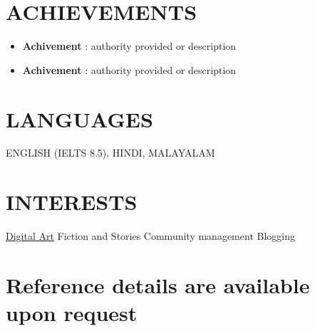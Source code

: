\documentclass[letterpaper,11pt]{article}
\begin{document}
\section{ACHIEVEMENTS}
 \begin{itemize}[leftmargin=0in, label={}]


 \item{ \textbf{Achivement } 
 : authority provided or description} 

  \item{ \textbf{Achivement } 
 : authority provided or description} 

    
 \end{itemize}
 
\section{LANGUAGES}
ENGLISH (IELTS 8.5), HINDI, MALAYALAM

\section{INTERESTS}
\faInstagram \hspace{2pt} \href{https://www.instagram.com/hellskipper/}{\uline{Digital Art}} 
      \hspace{1cm}Fiction and Stories\hspace{1cm}
\hspace{1cm}Community management \hspace{1cm}Blogging
 \section*{Reference details are available upon request}

\end{document}
